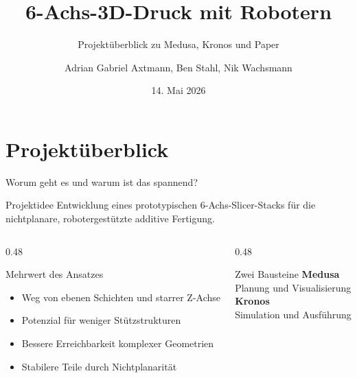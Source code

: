 \documentclass[aspectratio=169,11pt]{beamer}
\title{6-Achs-3D-Druck mit Robotern}
\subtitle{Projektüberblick zu Medusa, Kronos und Paper}
\author{Adrian Gabriel Axtmann, Ben Stahl, Nik Wachsmann}
\date{14. Mai 2026}
\begin{document}
\begin{frame}[plain]
  \titlepage
\end{frame}

\section{Projektüberblick}
\begin{frame}{Worum geht es und warum ist das spannend?}
  \begin{block}{Projektidee}
    Entwicklung eines prototypischen 6-Achs-Slicer-Stacks für die nichtplanare, robotergestützte additive Fertigung.
  \end{block}

  \begin{columns}[T,totalwidth=\textwidth]
    \begin{column}{0.48\textwidth}
      \begin{block}{Mehrwert des Ansatzes}
        \begin{itemize}
          \item Weg von ebenen Schichten und starrer Z-Achse
          \item Potenzial für weniger Stützstrukturen
          \item Bessere Erreichbarkeit komplexer Geometrien
          \item Stabilere Teile durch Nichtplanarität
        \end{itemize}
      \end{block}
    \end{column}
    \begin{column}{0.48\textwidth}
      \begin{block}{Zwei Bausteine}
        \textbf{Medusa}\\
        Planung und Visualisierung\\[0.7em]
        \textbf{Kronos}\\
        Simulation und Ausführung\\[0.7em]
      \end{block}
    \end{column}
  \end{columns}
\end{frame}
\end{document}
